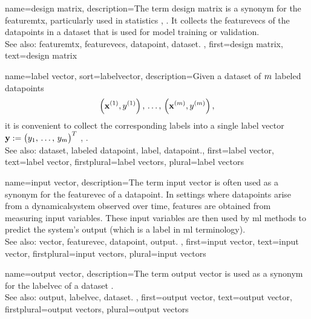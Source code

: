 {name={design matrix},
	description={The term design \gls{matrix} is a synonym 
 		for the \gls{featuremtx}, particularly used in statistics \cite{OxfordStatisticsDictionary}, \cite{Everitt2022}. 
 		It collects the \glspl{featurevec} of the \glspl{datapoint} in a \gls{dataset} 
 		that is used for \gls{model} \gls{training} or \gls{validation}.
		\\
		See also: \gls{featuremtx}, \glspl{featurevec}, \gls{datapoint}, \gls{dataset}. }, 
 	first={design matrix},
 	text={design matrix} 
}

{name={label vector},
sort={labelvector},
	description={Given a \gls{dataset} of $m$ \glspl{labeled datapoint} 
 		$$\left( {\bf x}^{(1)},y^{(1)} \right), \,\ldots, \,\left( {\bf x}^{(m)},y^{(m)} \right),$$ it 
 		is convenient to collect the corresponding \glspl{label} into a single 
 		\gls{label} \gls{vector} ${\bf y} := \big( y_{1},\,\ldots,\,y_{m}\big)^{T}$ 
 		\cite{BishopBook}, \cite{hastie01statisticallearning}. 
 		\\
 		See also: \gls{dataset}, \gls{labeled datapoint}, \gls{label}, \gls{datapoint}.},
 	first={label vector},
 	text={label vector}, 
 	firstplural={label vectors},
 	plural={label vectors}
}

{name={input vector},
	description={The term input \gls{vector} is often used 
		as a synonym for the \gls{featurevec} of a \gls{datapoint}. In settings where \glspl{datapoint} 
 		arise from a \gls{dynamicalsystem} observed over time, \glspl{feature} are obtained 
 		from measuring input variables. These input variables are then used 
 		by \gls{ml} methods to predict the system’s \gls{output} (which is a \gls{label} in \gls{ml} terminology).
		\\
		See also: \gls{vector}, \gls{featurevec}, \gls{datapoint}, \gls{output}. }, 
 	first={input vector}, 
 	text={input vector}, 
 	firstplural={input vectors}, 
 	plural={input vectors}
}

{name={output vector},
	description={The term \gls{output} \gls{vector} is used 
 		as a synonym for the \gls{labelvec} of a \gls{dataset} \cite{Murphy2012}.
		\\
		See also: \gls{output}, \gls{labelvec}, \gls{dataset}. },  
 	first={output vector}, 
 	text={output vector}, 
 	firstplural={output vectors}, 
 	plural={output vectors}
}

